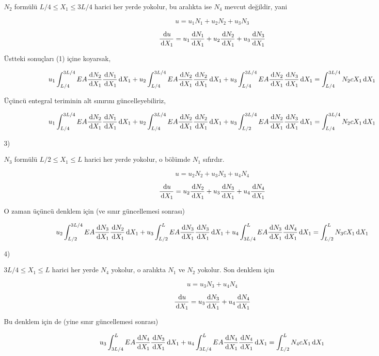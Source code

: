 \documentclass[12pt,fleqn]{article}\usepackage{../../common}
\begin{document}
$N_2$ formülü $L/4 \le X_1 \le 3L/4$ harici her yerde yokolur, bu aralıkta
ise $N_4$ mevcut değildir, yani

$$
u = u_1 N_1 + u_2 N_2 + u_3 N_3
$$

$$
\frac{\,\mathrm{d} u}{\,\mathrm{d} X_1} =
u_1 \frac{\,\mathrm{d} N_1}{\,\mathrm{d} X_1} + 
u_2 \frac{\,\mathrm{d} N_2}{\,\mathrm{d} X_1} + 
u_3 \frac{\,\mathrm{d} N_3}{\,\mathrm{d} X_1} 
$$

Üstteki sonuçları (1) içine koyarsak,

$$
u_1 \int_{L/4}^{3L/4} EA \frac{\,\mathrm{d} N_2}{\,\mathrm{d} X_1} \frac{\,\mathrm{d} N_1}{\,\mathrm{d} X_1} \,\mathrm{d} X_1 +
u_2 \int_{L/4}^{3L/4} EA \frac{\,\mathrm{d} N_2}{\,\mathrm{d} X_1} \frac{\,\mathrm{d} N_2}{\,\mathrm{d} X_1} \,\mathrm{d} X_1  +
u_3 \int_{L/4}^{3L/4} EA \frac{\,\mathrm{d} N_2}{\,\mathrm{d} X_1} \frac{\,\mathrm{d} N_3}{\,\mathrm{d} X_1} \,\mathrm{d} X_1 =
\int_{L/4}^{3L/4} N_2 c X_1 \,\mathrm{d} X_1
$$

Üçüncü entegral teriminin alt sınırını güncelleyebiliriz,

$$
u_1 \int_{L/4}^{3L/4} EA \frac{\,\mathrm{d} N_2}{\,\mathrm{d} X_1} \frac{\,\mathrm{d} N_1}{\,\mathrm{d} X_1} \,\mathrm{d} X_1 +
u_2 \int_{L/4}^{3L/4} EA \frac{\,\mathrm{d} N_2}{\,\mathrm{d} X_1} \frac{\,\mathrm{d} N_2}{\,\mathrm{d} X_1} \,\mathrm{d} X_1  +
u_3 \int_{L/2}^{3L/4} EA \frac{\,\mathrm{d} N_2}{\,\mathrm{d} X_1} \frac{\,\mathrm{d} N_3}{\,\mathrm{d} X_1} \,\mathrm{d} X_1 =
\int_{L/4}^{3L/4} N_2 c X_1 \,\mathrm{d} X_1
$$

3)

$N_3$ formülü $L/2 \le X_1 \le L$ harici her yerde yokolur, o bölümde $N_1$
sıfırdır. 

$$
u = u_2 N_2 + u_3 N_3 + u_4 N_4
$$

$$
\frac{\,\mathrm{d} u}{\,\mathrm{d} X_1} =
u_2 \frac{\,\mathrm{d} N_2}{\,\mathrm{d} X_1} + 
u_3 \frac{\,\mathrm{d} N_3}{\,\mathrm{d} X_1} + 
u_4 \frac{\,\mathrm{d} N_4}{\,\mathrm{d} X_1} 
$$

O zaman üçüncü denklem için (ve sınır güncellemesi sonrası)

$$
u_2 \int_{L/2}^{3L/4} EA \frac{\,\mathrm{d} N_3}{\,\mathrm{d} X_1} \frac{\,\mathrm{d} N_2}{\,\mathrm{d} X_1} \,\mathrm{d} X_1  +
u_3 \int_{L/2}^{L} EA \frac{\,\mathrm{d} N_3}{\,\mathrm{d} X_1} \frac{\,\mathrm{d} N_3}{\,\mathrm{d} X_1} \,\mathrm{d} X_1  +
u_4 \int_{3L/4}^{L} EA \frac{\,\mathrm{d} N_3}{\,\mathrm{d} X_1} \frac{\,\mathrm{d} N_4}{\,\mathrm{d} X_1} \,\mathrm{d} X_1 =
\int_{L/2}^{L} N_3 c X_1 \,\mathrm{d} X_1
$$

4)

$3L/4 \le X_1 \le L$ harici her yerde $N_4$ yokolur, o aralıkta $N_1$ ve $N_2$
yokolur. Son denklem için

$$
u = u_3 N_3 + u_4 N_4
$$

$$
\frac{\,\mathrm{d} u}{\,\mathrm{d} X_1} =
u_3 \frac{\,\mathrm{d} N_3}{\,\mathrm{d} X_1} + 
u_4 \frac{\,\mathrm{d} N_4}{\,\mathrm{d} X_1} 
$$

Bu denklem için de (yine sınır güncellemesi sonrası)

$$
u_3 \int_{3L/4}^{L} EA \frac{\,\mathrm{d} N_4}{\,\mathrm{d} X_1} \frac{\,\mathrm{d} N_3}{\,\mathrm{d} X_1} \,\mathrm{d} X_1  +
u_4 \int_{3L/4}^{L} EA \frac{\,\mathrm{d} N_4}{\,\mathrm{d} X_1} \frac{\,\mathrm{d} N_4}{\,\mathrm{d} X_1} \,\mathrm{d} X_1  =
\int_{L/2}^{L} N_4 c X_1 \,\mathrm{d} X_1
$$
\end{document}
